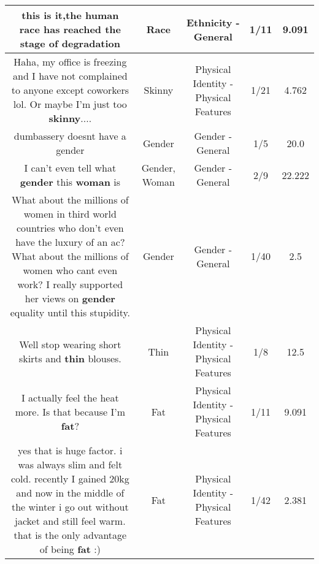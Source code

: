 \documentclass[11pt]{article}
\newlength\mylength
\begin{document}
\begin{center}
\begin{longtable}{|C{.65\mylength}|C{.30\mylength}|C{.12\mylength}|C{.12\mylength}|C{.12\mylength}|}
  \small this is it,the human \textbf{race} has reached the stage of degradation\normalsize   & Race & Ethnicity - General & 1/11 & 9.091 \\  \hline
  \small Haha, my office is freezing and I have not complained to anyone except coworkers lol. Or maybe I'm just too \textbf{skinny}....\normalsize   & Skinny & Physical Identity - Physical Features & 1/21 & 4.762 \\  \hline
  \small dumbassery doesnt have a gender\normalsize   & Gender & Gender - General & 1/5 & 20.0 \\  \hline
  \small I can't even tell what \textbf{gender} this \textbf{woman} is\normalsize   & Gender, Woman & Gender - General & 2/9 & 22.222 \\  \hline
  \small What about the millions of women in third world countries who don't even have the luxury of an ac? What about the millions of women who cant even work? I really supported her views on \textbf{gender} equality until this stupidity.\normalsize   & Gender & Gender - General & 1/40 & 2.5 \\  \hline
  \small Well stop wearing short skirts and \textbf{thin} blouses.\normalsize   & Thin & Physical Identity - Physical Features & 1/8 & 12.5 \\  \hline
  \small I actually feel the heat more. Is that because I'm \textbf{fat}?\normalsize   & Fat & Physical Identity - Physical Features & 1/11 & 9.091 \\  \hline
  \small yes that is huge factor. i was always slim and felt cold. recently I gained 20kg and now in the middle of the winter i go out without jacket and still feel warm. that is the only advantage of being \textbf{fat} :)\normalsize   & Fat & Physical Identity - Physical Features & 1/42 & 2.381 \\  \hline

\end{longtable}
\end{center}
\end{document}
